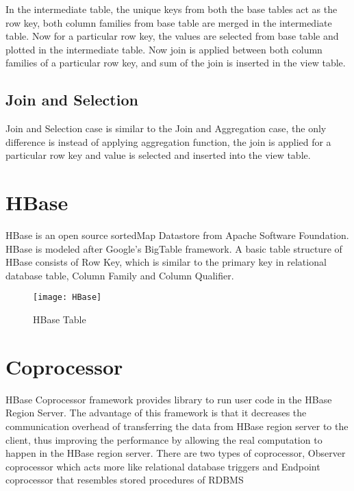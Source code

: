 \documentclass[11pt,a4paper,bibtotoc,idxtotoc,headsepline,footsepline,footexclude,BCOR12mm,DIV13]{scrbook}
\begin{document}
In the intermediate table, the unique keys from both the base tables act as the row key, both column families from base table are merged in the intermediate table. Now for a particular row key, the values are selected from base table and plotted in the intermediate table. Now join is applied between both column families of a particular row key, and sum of the join is inserted in the view table.  


\subsection{Join and Selection}
Join and Selection case is similar to the Join and Aggregation case, the only difference is instead of applying aggregation function, the join is applied for a particular row key and value is selected and inserted into the view table.


\section{HBase}
\label{sec:hbase}
HBase is an open source sortedMap Datastore from Apache Software Foundation. HBase is modeled after Google's BigTable framework. A basic table structure of HBase consists of Row Key, which is similar to the primary key in relational database table, Column Family and Column Qualifier.  

\begin{figure}
	\centering
	\texttt{[image: HBase]}
	\caption{HBase Table}
	\label{fig:hbasetable}
\end{figure}

\newpage
\section{Coprocessor}
\label{sec:coprocessor}

HBase Coprocessor framework provides library to run user code in the HBase Region Server. The advantage of this framework is that it decreases the communication overhead of transferring the data from HBase region server to the client, thus improving the performance by allowing the real computation to happen in the HBase region server\cite{coprocessor:coprocessor}. There are two types of coprocessor, Observer coprocessor  which acts more like relational database triggers and Endpoint coprocessor that resembles stored procedures of RDBMS\cite{coprocessor:types} 
\end{document}
